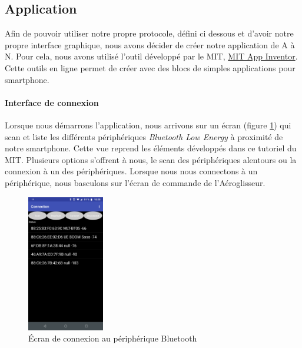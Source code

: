 			\subsection{Application}
			Afin de pouvoir utiliser notre propre protocole, défini ci dessous et d'avoir notre propre interface graphique, nous avons décider de créer notre application de A à N. Pour cela, nous avons utilisé l'outil développé par le MIT, \href{http://ai2.appinventor.mit.edu/}{ MIT App Inventor}. Cette outils en ligne permet de créer avec des blocs de simples applications pour smartphone.
		\paragraph{Interface de connexion} Lorsque nous démarrons l'application, nous arrivons sur un écran (figure \ref{Connec}) qui scan et liste les différents périphériques \textit{Bluetooth Low Energy} à proximité de notre smartphone. Cette vue reprend les éléments développés dans ce tutoriel \cite{tutoBLE} du MIT. Plusieurs options s'offrent à nous, le scan des périphériques alentours ou la connexion à un des périphériques. Lorsque nous nous connectons à un périphérique, nous basculons sur l'écran de commande de l'Aéroglisseur.
		\begin{figure}
			\begin{center}
				\includegraphics[width=0.3\textwidth]{../Illus/AppConnection.png}
			\end{center}
			\caption{Écran de connexion au périphérique Bluetooth}
			\label{Connec}
		\end{figure}
